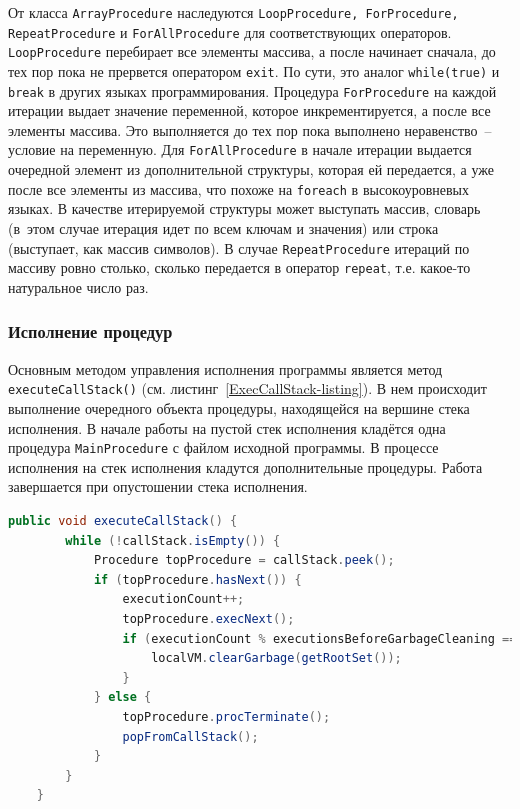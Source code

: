 \documentclass[14pt]{extarticle}
\begin{document}
От класса \texttt{ArrayProcedure} наследуются \texttt{LoopProcedure, ForProcedure, RepeatProcedure} и \texttt{ForAllProcedure} для соответствующих операторов. \texttt{LoopProcedure} перебирает все элементы массива, а после начинает сначала, до тех пор пока не прервется оператором \texttt{exit}. По сути, это аналог \texttt{while(true)} и \texttt{break} в других языках программирования. Процедура \texttt{ForProcedure} на каждой итерации выдает значение переменной, которое инкрементируется, а после все элементы массива. Это выполняется до тех пор пока выполнено неравенство~-- условие на переменную. Для \texttt{ForAllProcedure} в начале  итерации выдается очередной элемент из дополнительной структуры, которая ей передается, а уже после все элементы из массива, что похоже на \texttt{foreach} в высокоуровневых языках. В качестве итерируемой структуры может выступать массив, словарь (в~этом случае итерация идет по всем ключам и значения) или строка (выступает, как массив символов). В случае \texttt{RepeatProcedure} итераций по массиву ровно столько, сколько передается в оператор \texttt{repeat}, т.е. какое-то натуральное число раз.

\subsubsection*{Исполнение процедур}
Основным методом управления исполнения программы является метод \texttt{executeCallStack()} (см. листинг~\ref{ExecCallStack-listing}). В нем происходит выполнение очередного объекта процедуры, находящейся на вершине стека исполнения.  В начале работы на пустой стек исполнения кладётся одна процедура \texttt{MainProcedure} с файлом исходной программы. В процессе исполнения на стек исполнения кладутся дополнительные процедуры. Работа завершается при опустошении стека исполнения.

\begin{lstlisting}[label=ExecCallStack-listing,caption=Механизм исполнения, frame = none, language = Java]
    public void executeCallStack() {
        while (!callStack.isEmpty()) {
            Procedure topProcedure = callStack.peek();
            if (topProcedure.hasNext()) {
                executionCount++;
                topProcedure.execNext();
                if (executionCount % executionsBeforeGarbageCleaning == 0) {
                   	localVM.clearGarbage(getRootSet());
                }
            } else {
                topProcedure.procTerminate();
                popFromCallStack();
            }
        }
    }
\end{lstlisting}
\end{document}
